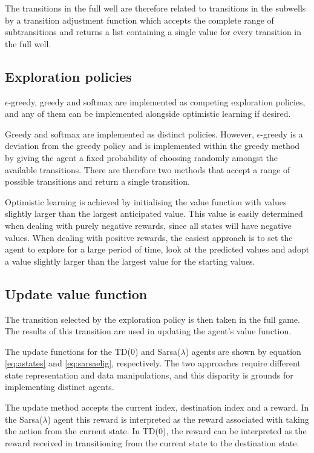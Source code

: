 \documentclass{rucsthesis}
\begin{document}
The transitions in the full well are therefore related to transitions in the subwells by a transition adjustment function which accepts the complete range of subtransitions and returns a list containing a single value for every transition in the full well.

\subsection{Exploration policies}

$\epsilon$-greedy, greedy and softmax are implemented as competing exploration policies, and any of them can be implemented alongside optimistic learning if desired.

Greedy and softmax are implemented as distinct policies. However, $\epsilon$-greedy is a deviation from the greedy policy and is implemented within the greedy method by giving the agent a fixed probability of choosing randomly amongst the available transitions. There are therefore two methods that accept a range of possible transitions and return a single transition.

Optimistic learning is achieved by initialising the value function with values slightly larger than the largest anticipated value. This value is easily determined when dealing with purely negative rewards, since all states will have negative values. When dealing with positive rewards, the easiest approach is to set the agent to explore for a large period of time, look at the predicted values and adopt a value slightly larger than the largest value for the starting values.

\subsection{Update value function}

The transition selected by the exploration policy is then taken in the full game. The results of this transition are used in updating the agent's value function.

The update functions for the TD(0) and Sarsa($\lambda$) agents are shown by equation \ref{eq:astates} and \ref{eq:sarsaelig}, respectively. The two approaches require different state representation and data manipulations, and this disparity is grounds for implementing distinct agents. 

The update method accepts the current index, destination index and a reward. In the Sarsa($\lambda$) agent this reward is interpreted as the reward associated with taking the action from the current state. In TD(0), the reward can be interpreted as the reward received in transitioning from the current state to the destination state.
\end{document}
